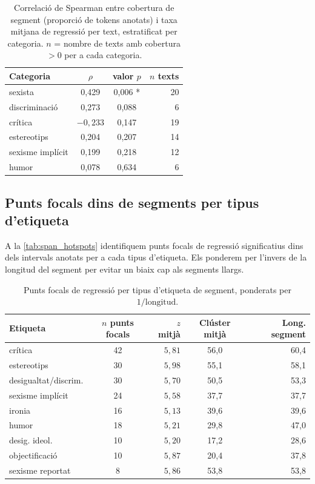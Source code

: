 \iftables
\begin{table}[htbp]
\small
\centering
\begin{tabular}{lccr}
\toprule
\textbf{Categoria} & \textbf{$\rho$} & \textbf{valor $p$} & \textbf{$n$ texts} \\
\midrule
sexista          & 0,429 & 0,006 * & 20 \\
discriminació   & 0,273 & 0,088 {\hphantom{*}} & 6 \\
crítica         & $-0,233$ & 0,147 {\hphantom{*}} & 19 \\
estereotips     & 0,204 & 0,207 {\hphantom{*}} & 14 \\
sexisme implícit& 0,199 & 0,218 {\hphantom{*}} & 12 \\
humor           & 0,078 & 0,634 {\hphantom{*}} & 6 \\
\bottomrule
\end{tabular}
\caption{Correlació de Spearman entre cobertura de segment (proporció de tokens anotats) i taxa mitjana de regressió per text, estratificat per categoria. $n$ = nombre de texts amb cobertura $> 0$ per a cada categoria.}
\label{tab:spearman_coverage}
\end{table}
 \fi

\subsection{Punts focals dins de segments per tipus d'etiqueta}

A la \autoref{tab:span_hotspots} identifiquem punts focals de regressió significatius dins dels intervals anotats per a cada tipus d'etiqueta. Els ponderem per l'invers de la longitud del segment per evitar un biaix cap als segments llargs.

\iftables
\begin{table}[htbp]
\small
\centering
\begin{tabular}{lcrcr}
\toprule
\textbf{Etiqueta} & \textbf{$n$ punts focals} & \textbf{$z$ mitjà} & \textbf{Clúster mitjà} & \textbf{Long. segment} \\
\midrule
crítica                 & 42 & $5,81$ & 56,0 & 60,4 \\
estereotips             & 30 & $5,98$ & 55,1 & 58,1 \\
desigualtat/discrim.    & 30 & $5,70$ & 50,5 & 53,3 \\
sexisme implícit        & 24 & $5,58$ & 37,7 & 37,7 \\
ironia                  & 16 & $5,13$ & 39,6 & 39,6 \\
humor                   & 18 & $5,21$ & 29,8 & 47,0 \\
desig. ideol.           & 10 & $5,20$ & 17,2 & 28,6 \\
objectificació          & 10 & $5,87$ & 20,4 & 37,8 \\
sexisme reportat        &  8 & $5,86$ & 53,8 & 53,8 \\
\bottomrule
\end{tabular}
\caption{Punts focals de regressió per tipus d'etiqueta de segment, ponderats per $1/\text{longitud}$.}
\label{tab:span_hotspots}
\end{table}
\fi

